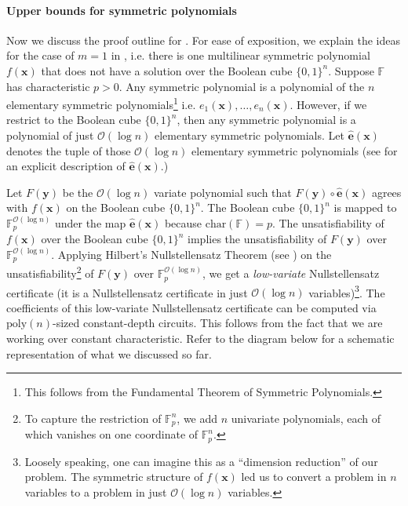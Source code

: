 \documentclass[11pt]{article}
\newcommand{\Boo}{\{0,1 \}}
\newcommand{\bigO}{\mathcal{O}}
\newcommand{\F}{\mathbb{F}}
\begin{document}
\paragraph{Upper bounds for symmetric polynomials}
Now we discuss the proof outline for . For ease of exposition, we explain the ideas for the case of $m = 1$ in , i.e. there is one multilinear symmetric polynomial $f(\mathbf{x})$ that does not have a solution over the Boolean cube $\Boo^{n}$. Suppose $\F$ has characteristic $p > 0$. Any symmetric polynomial is a polynomial of the $n$ elementary symmetric polynomials\footnote{This follows from the Fundamental Theorem of Symmetric Polynomials.} i.e. $e_{1}(\mathbf{x}), \ldots, e_{n}(\mathbf{x})$. However, if we restrict to the Boolean cube $\Boo^{n}$, then any symmetric polynomial is a polynomial of just $\bigO(\log n)$ elementary symmetric polynomials. Let $\widehat{\mathbf{e}}(\mathbf{x})$ denotes the tuple of those $\bigO(\log n)$ elementary symmetric polynomials (see  for an explicit description of $\widehat{\mathbf{e}}(\mathbf{x})$.)

Let $F(\mathbf{y})$ be the $\bigO(\log n)$ variate polynomial such that $F(\mathbf{y}) \circ \widehat{\mathbf{e}}(\mathbf{x})$ agrees with $f(\mathbf{x})$ on the Boolean cube $\Boo^{n}$. The Boolean cube $\Boo^{n}$ is mapped to $\F_{p}^{\bigO(\log n)}$ under the map $\widehat{\mathbf{e}}(\mathbf{x})$ because $\mathrm{char}(\F) = p$. The unsatisfiability of $f(\mathbf{x})$ over the Boolean cube $\Boo^{n}$ implies the unsatisfiability of $F(\mathbf{y})$ over $\F_{p}^{\bigO(\log n)}$. Applying Hilbert's Nullstellensatz Theorem (see ) on the unsatisfiability\footnote{To capture the restriction of $\F_{p}^{n}$, we add $n$ univariate polynomials, each of which vanishes on one coordinate of $\F_{p}^{n}$.} of $F(\mathbf{y})$ over $\F_{p}^{\bigO(\log n)}$, we get a \emph{low-variate} Nullstellensatz certificate (it is a Nullstellensatz certificate in just $\bigO(\log n)$ variables)\footnote{Loosely speaking, one can imagine this as a ``dimension reduction'' of our problem. The symmetric structure of $f(\mathbf{x})$ led us to convert a problem in $n$ variables to a problem in just $\bigO(\log n)$ variables.}. The coefficients of this low-variate Nullstellensatz certificate can be computed via $\mathrm{poly}(n)$-sized constant-depth circuits. This follows from the fact that we are working over constant characteristic. Refer to the diagram below for a schematic representation of what we discussed so far.
\end{document}
